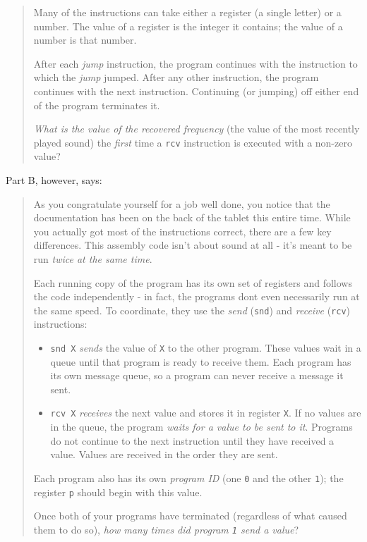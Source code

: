\documentclass[]{article}
\begin{document}
\begin{quote}
Many of the instructions can take either a register (a single letter) or a
number. The value of a register is the integer it contains; the value of a
number is that number.

After each \emph{jump} instruction, the program continues with the instruction
to which the \emph{jump} jumped. After any other instruction, the program
continues with the next instruction. Continuing (or jumping) off either end of
the program terminates it.

\emph{What is the value of the recovered frequency} (the value of the most
recently played sound) the \emph{first} time a \texttt{rcv} instruction is
executed with a non-zero value?
\end{quote}

Part B, however, says:

\begin{quote}
As you congratulate yourself for a job well done, you notice that the
documentation has been on the back of the tablet this entire time. While you
actually got most of the instructions correct, there are a few key differences.
This assembly code isn't about sound at all - it's meant to be run \emph{twice
at the same time}.

Each running copy of the program has its own set of registers and follows the
code independently - in fact, the programs don\textquotesingle t even
necessarily run at the same speed. To coordinate, they use the \emph{send}
(\texttt{snd}) and \emph{receive} (\texttt{rcv}) instructions:

\begin{itemize}
\tightlist
\item
  \texttt{snd\ X} \emph{sends} the value of \texttt{X} to the other program.
  These values wait in a queue until that program is ready to receive them. Each
  program has its own message queue, so a program can never receive a message it
  sent.
\item
  \texttt{rcv\ X} \emph{receives} the next value and stores it in register
  \texttt{X}. If no values are in the queue, the program \emph{waits for a value
  to be sent to it}. Programs do not continue to the next instruction until they
  have received a value. Values are received in the order they are sent.
\end{itemize}

Each program also has its own \emph{program ID} (one \texttt{0} and the other
\texttt{1}); the register \texttt{p} should begin with this value.

Once both of your programs have terminated (regardless of what caused them to do
so), \emph{how many times did program \texttt{1} send a value}?
\end{quote}
\end{document}
